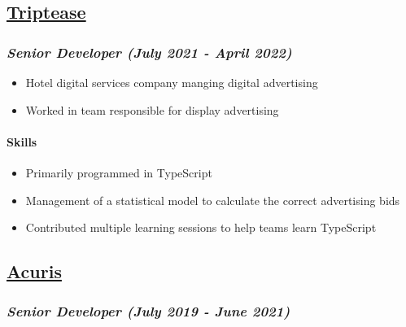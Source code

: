 \hypertarget{triptease}{%
\subsection{\texorpdfstring{\href{https://www.triptease.com/}{Triptease}}{Triptease}}\label{triptease}}

\hypertarget{senior-developer-july-2021---april-2022}{%
\subsubsection{\texorpdfstring{\emph{Senior Developer (July 2021 - April
2022)}}{Senior Developer (July 2021 - April 2022)}}\label{senior-developer-july-2021---april-2022}}

\begin{itemize}
\tightlist
\item
  Hotel digital services company manging digital advertising
\item
  Worked in team responsible for display advertising
\end{itemize}

\hypertarget{skills-triptease}{%
\paragraph{Skills}\label{skills-triptease}}

\begin{itemize}
\tightlist
\item
  Primarily programmed in TypeScript
\item
  Management of a statistical model to calculate the correct advertising
  bids
\item
  Contributed multiple learning sessions to help teams learn TypeScript
\end{itemize}

\hypertarget{acuris}{%
\subsection{\texorpdfstring{\href{http://www.acuris.com/}{Acuris}}{Acuris}}\label{acuris}}

\hypertarget{senior-developer-june-2019---present}{%
\subsubsection{\texorpdfstring{\emph{Senior Developer (July 2019 - June
2021)}}{Senior Developer (July 2019 - June 2021)}}\label{senior-developer-june-2019---present}}

